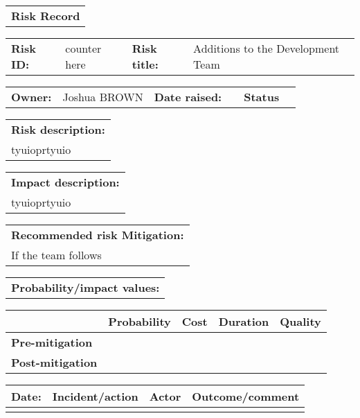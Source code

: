 \begin{table}
	\begin{tabularx}{\textwidth}{| X |}
		\hline
		\textbf{Risk Record} \\
	\end{tabularx}
	\begin{tabularx}{\textwidth}{| l | X | l | X |}
		\hline
		\textbf{Risk ID:} & counter here & \textbf{Risk title:} & Additions to the Development Team \\
	\end{tabularx}
	\begin{tabularx}{\textwidth}{| l | X | l | X | l | X |}
		\hline
		\textbf{Owner:} & Joshua BROWN & \textbf{Date raised:} &  & \textbf{Status} & \\
	\end{tabularx}
	\begin{tabularx}{\textwidth}{| X |}
		\hline
		\textbf{Risk description:} \\ tyuioprtyuio \\
	\end{tabularx}
	\begin{tabularx}{\textwidth}{| X |}
		\hline
		\textbf{Impact description:} \\ tyuioprtyuio \\
	\end{tabularx}
	\begin{tabularx}{\textwidth}{| X |}
		\hline
		\textbf{Recommended risk Mitigation:} \\ If the team follows  \\
	\end{tabularx}
	\begin{tabularx}{\textwidth}{| X |}
		\hline
		\textbf{Probability/impact values:} \\
	\end{tabularx}
	\begin{tabularx}{\textwidth}{| l | l | X | X | X |}
		\hline
		 &  \textbf{Probability} & \textbf{Cost} & \textbf{Duration} & \textbf{Quality} \\ \hline
		\textbf{Pre-mitigation} & & & & \\ \hline
		\textbf{Post-mitigation} & & & & \\ \hline \hline
	\end{tabularx}
	\begin{tabularx}{\textwidth}{| l | X | l | X |}
		\hline
		\textbf{Date:} & \textbf{Incident/action} & \textbf{Actor} & \textbf{Outcome/comment} \\ \hline
		 & &  &  \\ \hline
	\end{tabularx}
\end{table}



